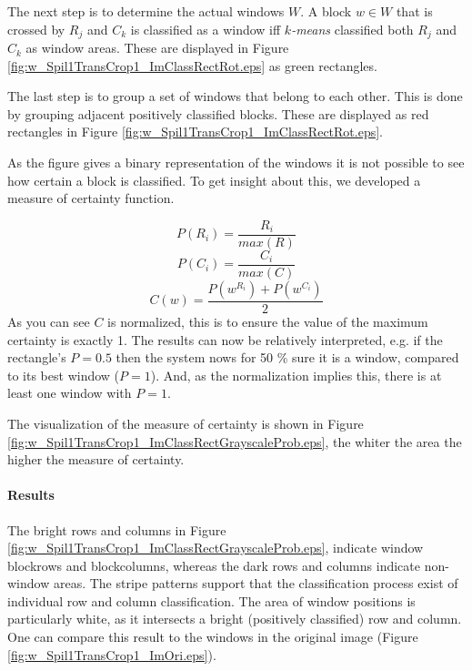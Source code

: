 The next step is to determine the actual windows $W$.
A block $w\in W$ that is crossed by $R_j$ and $C_k$ is classified as a
window iff \emph{$k$-means} classified both $R_j$ and $C_k$ as window areas. These are displayed in 
 Figure \ref{fig:w_Spil1TransCrop1_ImClassRectRot.eps} as green rectangles.

The last step is to group a set of windows that belong to each other. This is done by 
grouping adjacent positively classified blocks. These are displayed as red
rectangles in Figure \ref{fig:w_Spil1TransCrop1_ImClassRectRot.eps}.

As the figure gives a binary representation of the windows it is not possible
to see how certain a block is classified.
To get insight about this, we developed a measure of certainty function.

\[P(R_i) = \frac{R_i}{max(R)}\]
\[P(C_i) = \frac{C_i}{max(C)}\]
\[C(w) = \frac{P(w^{R_i}) + P(w^{C_i})}{2}\]
As you can see $C$ is normalized, this is to ensure the value of the maximum
certainty is exactly 1. The results can now be relatively interpreted, e.g. if the rectangle's $P=0.5$
then the system nows for 50 \% sure it is a window, compared to its best window ($P=1$). 
And, as the normalization implies this, there is at least one window with $P=1$. 

The visualization of the measure of certainty is shown in Figure
\ref{fig:w_Spil1TransCrop1_ImClassRectGrayscaleProb.eps},  
the whiter the area the higher the measure of certainty.



\paragraph{Results} %
\clearpage

The bright rows and columns in Figure
\ref{fig:w_Spil1TransCrop1_ImClassRectGrayscaleProb.eps},  indicate window
blockrows and blockcolumns, whereas the dark rows and columns indicate
non-window areas.
The stripe patterns support that the classification process exist of individual
row and column classification.
The area of window positions is particularly white, as it 
intersects a bright (positively classified) row and column.
One can compare this result to the windows in the original image 
(Figure \ref{fig:w_Spil1TransCrop1_ImOri.eps}).

